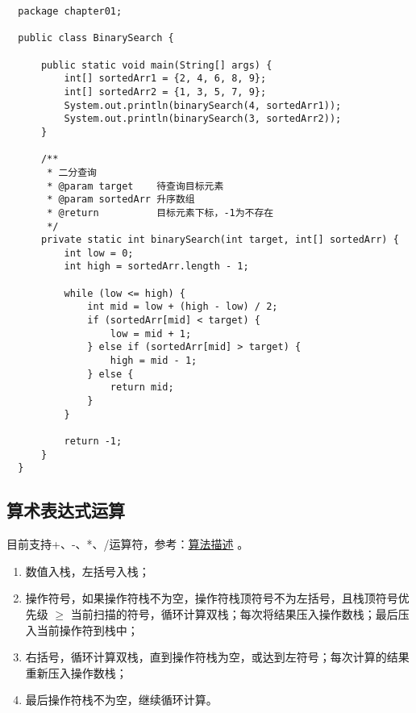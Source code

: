 \documentclass{article}
\begin{document}
  \begin{verbatim}
  package chapter01;

  public class BinarySearch {

      public static void main(String[] args) {
          int[] sortedArr1 = {2, 4, 6, 8, 9};
          int[] sortedArr2 = {1, 3, 5, 7, 9};
          System.out.println(binarySearch(4, sortedArr1));
          System.out.println(binarySearch(3, sortedArr2));
      }

      /**
       * 二分查询
       * @param target    待查询目标元素
       * @param sortedArr 升序数组
       * @return          目标元素下标，-1为不存在
       */
      private static int binarySearch(int target, int[] sortedArr) {
          int low = 0;
          int high = sortedArr.length - 1;

          while (low <= high) {
              int mid = low + (high - low) / 2;
              if (sortedArr[mid] < target) {
                  low = mid + 1;
              } else if (sortedArr[mid] > target) {
                  high = mid - 1;
              } else {
                  return mid;
              }
          }

          return -1;
      }
  }
  \end{verbatim}

  \subsection{算术表达式运算}
  目前支持+、-、*、/运算符，参考：\href{http://faculty.cs.niu.edu/~hutchins/csci241/eval.htm}{算法描述} 。
  \begin{enumerate}
    \item 数值入栈，左括号入栈；
    \item 操作符号，如果操作符栈不为空，操作符栈顶符号不为左括号，且栈顶符号优先级 $\geq$ 当前扫描的符号，循环计算双栈；每次将结果压入操作数栈；最后压入当前操作符到栈中；
    \item 右括号，循环计算双栈，直到操作符栈为空，或达到左符号；每次计算的结果重新压入操作数栈；
    \item 最后操作符栈不为空，继续循环计算。
  \end{enumerate}
\end{document}

